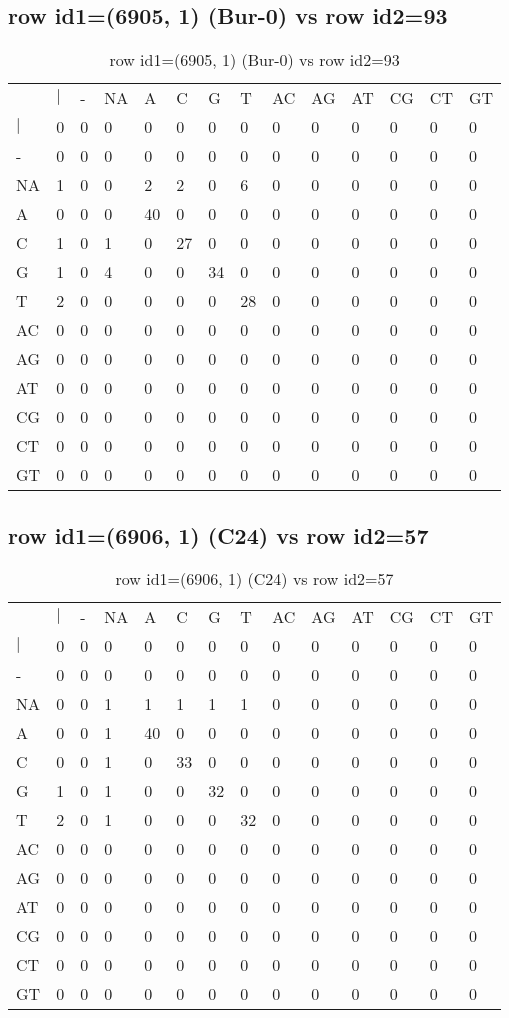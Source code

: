 \subsection{row id1=(6905, 1) (Bur-0) vs row id2=93}
\begin{center}
\begin{longtable}{|l|l|l|l|l|l|l|l|l|l|l|l|l|l|}
\caption{row id1=(6905, 1) (Bur-0) vs row id2=93} \label{table_dm72}\\
\hline
\\
\hline
&$|$&-&NA&A&C&G&T&AC&AG&AT&CG&CT&GT\\
$|$&0&0&0&0&0&0&0&0&0&0&0&0&0\\
-&0&0&0&0&0&0&0&0&0&0&0&0&0\\
NA&1&0&0&2&2&0&6&0&0&0&0&0&0\\
A&0&0&0&40&0&0&0&0&0&0&0&0&0\\
C&1&0&1&0&27&0&0&0&0&0&0&0&0\\
G&1&0&4&0&0&34&0&0&0&0&0&0&0\\
T&2&0&0&0&0&0&28&0&0&0&0&0&0\\
AC&0&0&0&0&0&0&0&0&0&0&0&0&0\\
AG&0&0&0&0&0&0&0&0&0&0&0&0&0\\
AT&0&0&0&0&0&0&0&0&0&0&0&0&0\\
CG&0&0&0&0&0&0&0&0&0&0&0&0&0\\
CT&0&0&0&0&0&0&0&0&0&0&0&0&0\\
GT&0&0&0&0&0&0&0&0&0&0&0&0&0\\
\hline
\end{longtable}
\end{center}

\subsection{row id1=(6906, 1) (C24) vs row id2=57}
\begin{center}
\begin{longtable}{|l|l|l|l|l|l|l|l|l|l|l|l|l|l|}
\caption{row id1=(6906, 1) (C24) vs row id2=57} \label{table_dm74}\\
\hline
\\
\hline
&$|$&-&NA&A&C&G&T&AC&AG&AT&CG&CT&GT\\
$|$&0&0&0&0&0&0&0&0&0&0&0&0&0\\
-&0&0&0&0&0&0&0&0&0&0&0&0&0\\
NA&0&0&1&1&1&1&1&0&0&0&0&0&0\\
A&0&0&1&40&0&0&0&0&0&0&0&0&0\\
C&0&0&1&0&33&0&0&0&0&0&0&0&0\\
G&1&0&1&0&0&32&0&0&0&0&0&0&0\\
T&2&0&1&0&0&0&32&0&0&0&0&0&0\\
AC&0&0&0&0&0&0&0&0&0&0&0&0&0\\
AG&0&0&0&0&0&0&0&0&0&0&0&0&0\\
AT&0&0&0&0&0&0&0&0&0&0&0&0&0\\
CG&0&0&0&0&0&0&0&0&0&0&0&0&0\\
CT&0&0&0&0&0&0&0&0&0&0&0&0&0\\
GT&0&0&0&0&0&0&0&0&0&0&0&0&0\\
\hline
\end{longtable}
\end{center}

